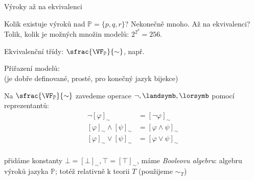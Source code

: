 \documentclass{beamer}
\begin{document}
\begin{frame}{Výroky až na ekvivalenci}

    Kolik existuje výroků nad $\mathbb P=\{p,q,r\}$? Nekonečně mnoho. \alert{Až na ekvivalenci?} Tolik, kolik je možných množin modelů: $2^{2^3}=256$.


    Ekvivalenční třídy: \alert{$\sfrac{\VF_\mathbb P}{\sim}$}, např. 

    Přiřazení modelů: \\        
    (je dobře definované, prosté, pro konečný jazyk bijekce)

    Na $\sfrac{\VF_\mathbb P}{\sim}$ zavedeme operace $\neg,\landsymb,\lorsymb$ \alert{pomocí reprezentantů}:
    {\small
    \begin{align*}
        \neg [\varphi]_\sim &=[\neg\varphi]_\sim\\
        [\varphi]_\sim \land [\psi]_\sim &= [\varphi\land\psi]_\sim\\
        [\varphi]_\sim \lor [\psi]_\sim &= [\varphi\lor\psi]_\sim\\
    \end{align*}
    }

    \vspace{-18pt}
    přidáme konstanty {\small $\bot=[\bot]_\sim,\top=[\top]_\sim$}, máme \emph{Booleovu algebru}: \alert{algebru výroků} jazyka $\mathbb P$; totéž relativně k teorii $T$ (\alert{použijeme $\sim_T$})

\end{frame}
\end{document}
